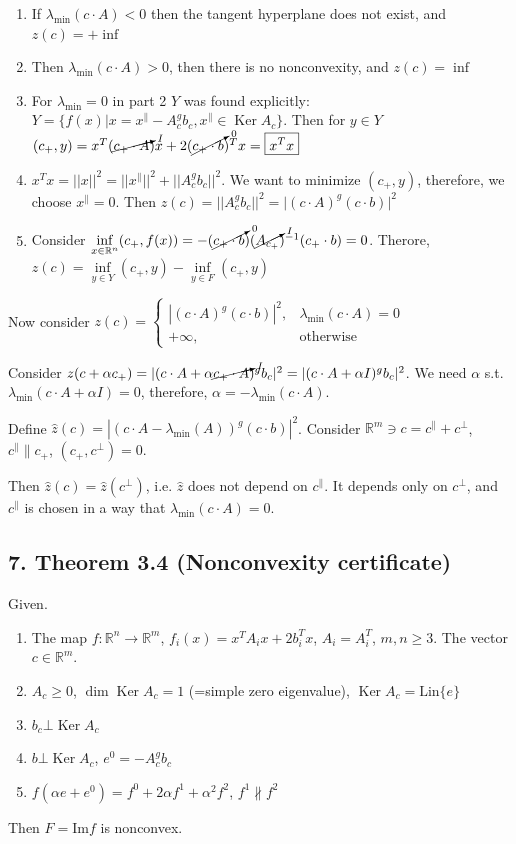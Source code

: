 \documentclass[a4paper]{article}
\DeclareMathOperator{\Ker}{Ker}
\begin{document}
\begin{enumerate}
\item If $\lambda_{\min}(c\cdot A)<0$ then the tangent hyperplane does not exist, and $z(c)=+\inf$
\item Then $\lambda_{\min}(c\cdot A)>0$, then there is no nonconvexity, and $z(c)=\inf$
\item For $\lambda_{\min}=0$ in part 2 $Y$ was found explicitly: $Y=\{f(x)\big|x=x^\parallel-A_c^gb_c, x^\parallel \in\Ker A_c\}$. Then for $y\in Y$ $(c_+,y)=x^T(\cancelto{I}{c_+\cdot A})x+2(\cancelto{0}{c_+\cdot b})^Tx=\boxed{x^Tx}$
\item $x^Tx=||x||^2=||x^\parallel||^2+||A_c^gb_c||^2$. We want to minimize $(c_+,y)$, therefore, we choose $x^\parallel=0$. Then $z(c)=||A_c^gb_c||^2=\boxed{\big|(c \cdot A)^g(c\cdot b) \big|^2}$
\item Consider $\inf\limits_{x\in\mathbb{R}^n} (c_+,f(x))=-(\cancelto{0}{c_+\cdot b})(\cancelto{I}{A_{c_+}})^{-1}(c_+\cdot b)=0$. Therore, $z(c)=\inf\limits_{y\in Y}(c_+,y)-\inf\limits_{y\in F}(c_+,y)$
\end{enumerate}

Now consider $z(c)=\begin{cases}
|(c\cdot A)^g(c\cdot b)|^2,&\lambda_{\min}(c\cdot A)=0\\
+\infty, & \mbox{otherwise}
\end{cases}$

Consider $z(c+\alpha c_+)=|(c\cdot A+\alpha \cancelto{I}{c_+\cdot A})^gb_c|^2=|(c\cdot A+\alpha I)^gb_c|^2$. We need $\alpha$ s.t. $\lambda_{\min}(c\cdot A+\alpha I)=0$, therefore, $\alpha=-\lambda_{\min}(c\cdot A)$.

Define $\hat{z}(c)=|(c\cdot A-\lambda_{\min}(A))^g(c\cdot b)|^2$. Consider $\mathbb{R}^m\ni c=c^{\parallel}+c^{\bot}$, $c^{\parallel}\parallel c_+$, $(c_+,c^{\bot})=0$.

Then $\hat{z}(c)=\hat{z}(c^{\bot})$, i.e. $\hat{z}$ does not depend on $c^{\parallel}$. It depends only on $c^{\bot}$, and $c^{\parallel}$ is chosen in a way that $\lambda_{\min}(c\cdot A)=0$.
\subsection*{7. Theorem 3.4 (Nonconvexity certificate)}
Given.
\begin{enumerate}
\item The map $f\colon\mathbb{R}^n\to\mathbb{R}^m$, $f_i(x)=x^TA_ix+2b_i^Tx$, $A_i=A_i^T$, $m,n\geqslant 3$. The vector $c\in\mathbb{R}^m$.
\item $A_c\geqslant 0$, $\dim\Ker A_c=1$ (=simple zero eigenvalue), $\Ker A_c=\mbox{Lin}\{e\}$
\item $b_c\bot \Ker A_c$
\item $b\bot\Ker A_c$, $e^0=-A_c^gb_c$
\item $f(\alpha e+e^0)=f^0+2\alpha f^1+\alpha^2f^2$, $f^1\nparallel f^2$
\end{enumerate}
Then $F=\mbox{Im} f$ is nonconvex.
\end{document}
